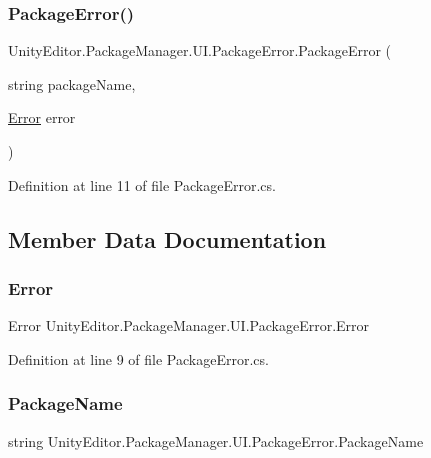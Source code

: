 \subsubsection{\texorpdfstring{PackageError()}{PackageError()}}
{\footnotesize\ttfamily Unity\+Editor.\+Package\+Manager.\+U\+I.\+Package\+Error.\+Package\+Error (\begin{DoxyParamCaption}\item[{string}]{package\+Name,  }\item[{\mbox{\hyperlink{class_unity_editor_1_1_package_manager_1_1_u_i_1_1_package_error_a7d20592a8a4535b5757ac4254d77bdf5}{Error}}}]{error }\end{DoxyParamCaption})}



Definition at line 11 of file Package\+Error.\+cs.



\subsection{Member Data Documentation}
\mbox{\label{class_unity_editor_1_1_package_manager_1_1_u_i_1_1_package_error_a7d20592a8a4535b5757ac4254d77bdf5}} 
\subsubsection{\texorpdfstring{Error}{Error}}
{\footnotesize\ttfamily Error Unity\+Editor.\+Package\+Manager.\+U\+I.\+Package\+Error.\+Error}



Definition at line 9 of file Package\+Error.\+cs.

\mbox{\label{class_unity_editor_1_1_package_manager_1_1_u_i_1_1_package_error_abd72df12fe2d47823bcfc232855146b7}} 
\subsubsection{\texorpdfstring{PackageName}{PackageName}}
{\footnotesize\ttfamily string Unity\+Editor.\+Package\+Manager.\+U\+I.\+Package\+Error.\+Package\+Name}



